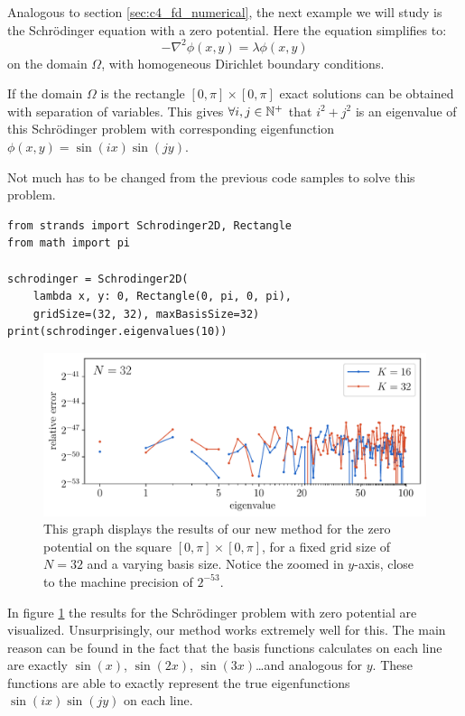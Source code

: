 Analogous to section \ref{sec:c4_fd_numerical}, the next example we will study is the Schrödinger equation with a zero potential. Here the equation simplifies to:
$$
    -\nabla^2 \phi(x, y) = \lambda\phi(x, y)
$$
on the domain $\Omega$, with homogeneous Dirichlet boundary conditions.

If the domain $\Omega$ is the rectangle $[0, \pi] \times [0, \pi]$ exact solutions can be obtained with separation of variables. This gives $\forall i, j \in \mathbb{N}^{+}$ that $i^2 + j^2$ is an eigenvalue of this Schrödinger problem with corresponding eigenfunction $\phi(x, y) = \sin(i x)\sin(j y)$.

Not much has to be changed from the previous code samples to solve this problem.
\begin{verbatim}
from strands import Schrodinger2D, Rectangle
from math import pi

schrodinger = Schrodinger2D(
    lambda x, y: 0, Rectangle(0, pi, 0, pi),
    gridSize=(32, 32), maxBasisSize=32)
print(schrodinger.eigenvalues(10))
\end{verbatim}

\begin{figure}
    \begin{center}
        \includegraphics[width=\textwidth]{img/chapter4/nm_test_zero_rectangle.pdf}
    \end{center}
    \caption{This graph displays the results of our new method for the zero potential on the square $[0, \pi] \times [0, \pi]$, for a fixed grid size of $N = 32$ and a varying basis size. Notice the zoomed in $y$-axis, close to the machine precision of $2^{-53}$.}
    \label{fig:c4_nm_zero_test_rectangle}
\end{figure}

In figure \ref{fig:c4_nm_zero_test_rectangle} the results for the Schrödinger problem with zero potential are visualized. Unsurprisingly, our method works extremely well for this. The main reason can be found in the fact that the basis functions \matslise{} calculates on each line are exactly $\sin(x)$, $\sin(2x)$, $\sin(3x)$\dots and analogous for $y$. These functions are able to exactly represent the true eigenfunctions $\sin(i x)\sin(j y)$ on each line.

